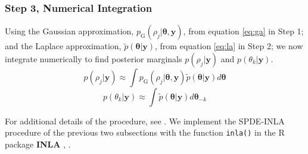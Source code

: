 \subsubsection{Step 3, Numerical Integration} %
Using the Gaussian approximation, $p_{\text{G}}(\rho_{j}|\pmb{\theta, y})$, from equation \ref{eq:ga} in Step 1; and the Laplace approximation, $\tilde{p}(\pmb{\theta}|\pmb{y})$, from equation \ref{eq:la} in Step 2; we now integrate numerically to find posterior marginals $p(\rho_{j}|\pmb{y})$ and $p(\theta_{k}|\pmb{y})$. 
        $$ p(\rho_{j} | \pmb{y}) \approx \int p_{\text{G}}(\rho_{j}|\pmb{\theta, y})\tilde{p}(\pmb{\theta}|\pmb{y}) d\pmb{\theta} $$
        $$ p(\theta_{k} | \pmb{y}) \approx \int \tilde{p}(\pmb{\theta}|\pmb{y}) d\pmb{\theta}_{-k} $$
        
For additional details of the procedure, see \cite{Rue2009}. We implement the SPDE-INLA procedure of the previous two subsections with the function \verb|inla()| in the R package {\bf INLA} \citep{INLA}, \citep{Lindgren2015}.
        

